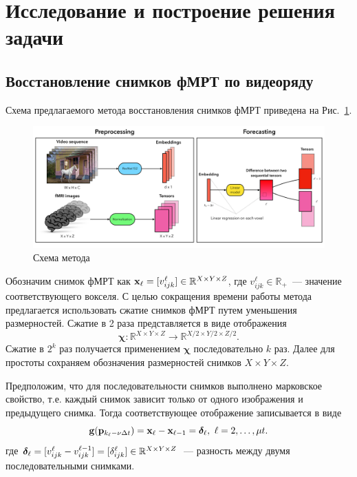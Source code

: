\section{Исследование и построение решения задачи}\label{sec2}
\subsection{Восстановление снимков фМРТ по видеоряду}
Схема предлагаемого метода восстановления снимков фМРТ приведена на Рис.~\ref{fig:scheme}.

\begin{figure}[h!]
	\centering
	\includegraphics[width=1\textwidth]{images/scheme.pdf}
	\caption{Схема метода}
	\label{fig:scheme}
\end{figure}
Обозначим снимок фМРТ как $\mathbf{x}_{\ell} = [v^{\ell}_{ijk}] \in \mathbb{R}^{X \times Y \times Z}$,
где $v^{\ell}_{ijk} \in \mathbb{R}_+$~--- значение соответствующего вокселя.
С целью сокращения времени работы метода предлагается использовать сжатие снимков фМРТ путем уменьшения размерностей.
Сжатие в 2 раза представляется в виде отображения
\[\bm{\chi}: \mathbb{R}^{X \times Y \times Z} \to \mathbb{R}^{X/2 \times Y/2 \times Z/2}.\]
Сжатие в $2^k$ раз получается применением $\bm{\chi}$ последовательно $k$ раз. 
Далее для простоты сохраняем обозначения размерностей снимков $X \times Y \times Z$.

Предположим, что для последовательности снимков выполнено марковское свойство,
т.е. каждый снимок зависит только от одного изображения и предыдущего снимка.
Тогда соответствующее отображение записывается в виде
\begin{equation*}
	\label{eq5}
	\mathbf{g}(\mathbf{p}_{k_{\ell} - \nu \Delta t}) = \mathbf{x}_{\ell} - \mathbf{x}_{\ell-1} = \boldsymbol{\delta}_{\ell}, \ \ell = 2, \ldots, \mu t.
\end{equation*}
где $\boldsymbol{\delta}_{\ell} = [v^{\ell}_{ijk} - v^{\ell-1}_{ijk}] = [\delta^{\ell}_{ijk}] \in \mathbb{R}^{X \times Y \times Z}$~--- разность между двумя последовательными снимками.

